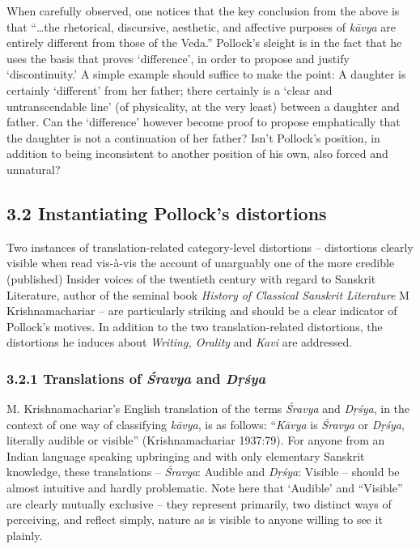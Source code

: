 When carefully observed, one notices that the key conclusion from the above is that “…the rhetorical, discursive, aesthetic, and affective purposes of \textit{kāvya} are entirely different from those of the Veda.” Pollock’s sleight is in the fact that he uses the basis that proves ‘difference’, in order to propose and justify ‘discontinuity.’ A simple example should suffice to make the point: A daughter is certainly ‘different’ from her father; there certainly is a ‘clear and untranscendable line’ (of physicality, at the very least) between a daughter and father. Can the ‘difference’ however become proof to propose emphatically that the daughter is not a continuation of her father? Isn’t Pollock’s position, in addition to being inconsistent to another position of his own, also forced and unnatural?


\subsection*{3.2 Instantiating Pollock’s distortions}

\vskip -8pt

Two instances of translation-related category-level distortions – distortions clearly visible when read vis-à-vis the account of unarguably one of the more credible (published) Insider voices of the twentieth century with regard to Sanskrit Literature, author of the seminal book \textit{History of Classical Sanskrit Literature} M Krishnamachariar – are particularly striking and should be a clear indicator of Pollock’s motives. In addition to the two translation-related distortions, the distortions he induces about \textit{Writing, Orality} and \textit{Kavi} are addressed. 

\vskip -18pt

\subsubsection*{3.2.1 Translations of \textit{Śravya} and \textit{Dṛśya}}

\vskip -5pt

M. Krishnamachariar’s English translation of the terms \textit{Śravya} and \textit{Dṛśya}, in the context of one way of classifying \textit{kāvya}, is as follows: “\textit{Kāvya} is \textit{Śravya} or \textit{Dṛśya}, literally audible or visible” (Krishnamachariar 1937:79). For anyone from an Indian language speaking upbringing and with only elementary Sanskrit knowledge, these translations – \textit{Śravya}: Audible and \textit{Dṛśya}: Visible – should be almost intuitive and hardly problematic. Note here that ‘Audible’ and “Visible” are clearly mutually exclusive – they represent primarily, two distinct ways of perceiving, and reflect simply, nature as is visible to anyone willing to see it plainly.

